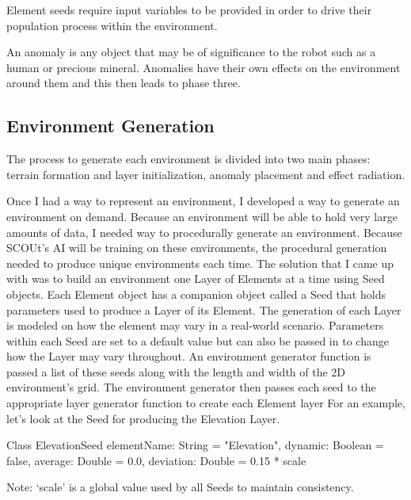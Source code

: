 \documentclass[]{report}
\begin{document}
Element seeds require input variables to be provided in order to drive their population process within the environment.

An anomaly is any object that may be of significance to the robot such as a human or precious mineral.
Anomalies have their own effects on the environment around them and this then leads to phase three.

\subsection{Environment Generation}
The process to generate each environment is divided into two main phases: terrain formation and layer initialization, anomaly placement and effect radiation.

Once I had a way to represent an environment, I developed a way to generate an environment on demand.
Because an environment will be able to hold very large amounts of data, I needed way to procedurally generate an environment.
Because SCOUt’s AI will be training on these environments, the procedural generation needed to produce unique environments each time.
The solution that I came up with was to build an environment one Layer of Elements at a time using Seed objects.
Each Element object has a companion object called a Seed that holds parameters used to produce a Layer of its Element.
The generation of each Layer is modeled on how the element may vary in a real-world scenario.
Parameters within each Seed are set to a default value but can also be passed in to change how the Layer may vary throughout.
An environment generator function is passed a list of these seeds along with the length and width of the 2D environment’s grid.
The environment generator then passes each seed to the appropriate layer generator function to create each Element layer
For an example, let’s look at the Seed for producing the Elevation Layer.

Class ElevationSeed {
	elementName: String = "Elevation",
    	dynamic: Boolean = false,
    	average: Double = 0.0,
    	deviation: Double = 0.15 * scale
}

Note: ‘scale’ is a global value used by all Seeds to maintain consistency.
\end{document}
